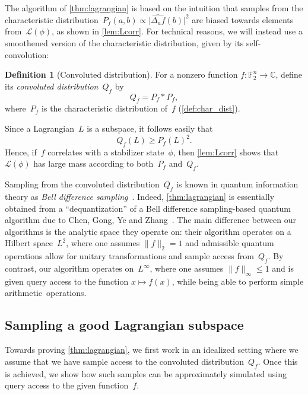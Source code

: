 \documentclass[11pt]{amsart}
\newcommand{\C}{\mathbb{C}} %
\newcommand{\F}{\mathbb{F}} %
\newcommand{\Lcal}{\mathcal{L}}
\theoremstyle{plain}
\theoremstyle{definition}
\newtheorem{definition}[theorem]{Definition}
\theoremstyle{remark}
\begin{document}
The algorithm of \cref{thm:lagrangian} is based on the intuition that samples from the characteristic distribution~$P_f(a, b) \propto \big|\widehat{\Delta_af}(b)\big|^2$ are biased towards elements from~$\mathcal L(\phi)$, as shown in \cref{lem:Lcorr}.
For technical reasons, we will instead use a smoothened version of the characteristic distribution, given by its self-convolution:

\begin{definition}[Convoluted distribution]
    For a nonzero function $f:\F_2^n\to \C$, define its \emph{convoluted distribution}~$Q_f$ by
    \begin{equation*}
        Q_f = P_f*P_f,
    \end{equation*}
    where~$P_f$ is the characteristic distribution of~$f$ (\cref{def:char_dist}).
\end{definition}

Since a Lagrangian~$L$ is a subspace, it follows easily that
\begin{equation*}
Q_f(L) \geq P_f(L)^2.
\end{equation*}
Hence, if~$f$ correlates with a stabilizer state~$\phi$, then \cref{lem:Lcorr} shows that $\Lcal(\phi)$ has large mass according to both~$P_f$ and~$Q_f$.

Sampling from the convoluted distribution~$Q_f$ is known in quantum information theory as \emph{Bell difference sampling}~\cite{Gross2021}.
Indeed, \cref{thm:lagrangian} is essentially obtained from a ``dequantization'' of a Bell difference sampling-based quantum algorithm due to Chen, Gong, Ye and Zhang~\cite{chen2024stabilizer}.
The main difference between our algorithms is the analytic space they operate on:
their algorithm operates on a Hilbert space~$L^2$, where one assumes $\|f\|_2 = 1$ and admissible quantum operations allow for unitary transformations and sample access from~$Q_f$.
By contrast, our algorithm operates on~$L^\infty$, where one assumes $\|f\|_\infty \leq 1$ and is given query access to the function $x \mapsto f(x)$, while being able to perform simple arithmetic~operations.


\subsection{Sampling a good Lagrangian subspace} \label{sec:Lagrangian}
Towards proving \cref{thm:lagrangian}, we first work in an idealized setting where we assume that we have sample access to the convoluted distribution~$Q_f$.
Once this is achieved, we show how such samples can be approximately simulated using  query access to the given function~$f$.
\end{document}
